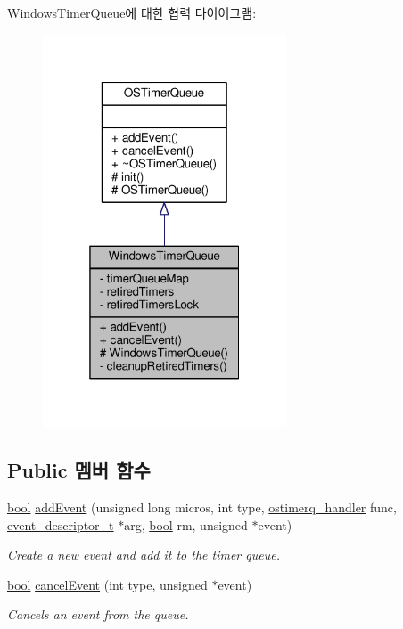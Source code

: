 Windows\+Timer\+Queue에 대한 협력 다이어그램\+:
\nopagebreak
\begin{figure}[H]
\begin{center}
\leavevmode
\includegraphics[width=205pt]{class_windows_timer_queue__coll__graph}
\end{center}
\end{figure}
\subsection*{Public 멤버 함수}
\begin{DoxyCompactItemize}
\item 
\hyperlink{avb__gptp_8h_af6a258d8f3ee5206d682d799316314b1}{bool} \hyperlink{class_windows_timer_queue_af91c63e95e1888dc178cbd09764ae2af}{add\+Event} (unsigned long micros, int type, \hyperlink{avbts__ostimerq_8hpp_ac7e0bdbe70d3e2951c02906cf4ed3aed}{ostimerq\+\_\+handler} func, \hyperlink{structevent__descriptor__t}{event\+\_\+descriptor\+\_\+t} $\ast$arg, \hyperlink{avb__gptp_8h_af6a258d8f3ee5206d682d799316314b1}{bool} rm, unsigned $\ast$event)
\begin{DoxyCompactList}\small\item\em Create a new event and add it to the timer queue. \end{DoxyCompactList}\item 
\hyperlink{avb__gptp_8h_af6a258d8f3ee5206d682d799316314b1}{bool} \hyperlink{class_windows_timer_queue_a85d2e5f092c3854728747bdb9177291d}{cancel\+Event} (int type, unsigned $\ast$event)
\begin{DoxyCompactList}\small\item\em Cancels an event from the queue. \end{DoxyCompactList}\end{DoxyCompactItemize}
